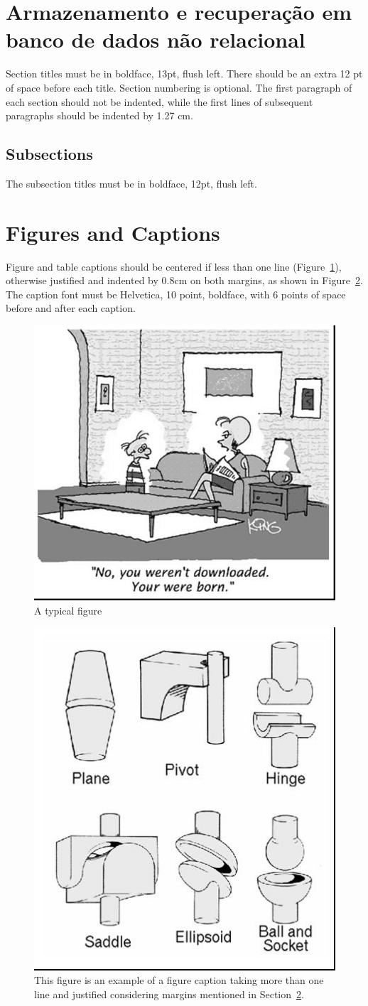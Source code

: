 \documentclass[12pt]{article}
\begin{document}
\section{Armazenamento e recuperação em banco de dados não relacional}

Section titles must be in boldface, 13pt, flush left. There should be an extra
12 pt of space before each title. Section numbering is optional. The first
paragraph of each section should not be indented, while the first lines of
subsequent paragraphs should be indented by 1.27 cm.

\subsection{Subsections}

The subsection titles must be in boldface, 12pt, flush left.

\section{Figures and Captions}\label{sec:figs}


Figure and table captions should be centered if less than one line
(Figure~\ref{fig:exampleFig1}), otherwise justified and indented by 0.8cm on
both margins, as shown in Figure~\ref{fig:exampleFig2}. The caption font must
be Helvetica, 10 point, boldface, with 6 points of space before and after each
caption.

\begin{figure}[ht]
\centering
\includegraphics[width=.5\textwidth]{fig1.jpg}
\caption{A typical figure}
\label{fig:exampleFig1}
\end{figure}

\begin{figure}[ht]
\centering
\includegraphics[width=.3\textwidth]{fig2.jpg}
\caption{This figure is an example of a figure caption taking more than one
  line and justified considering margins mentioned in Section~\ref{sec:figs}.}
\label{fig:exampleFig2}
\end{figure}
\end{document}
